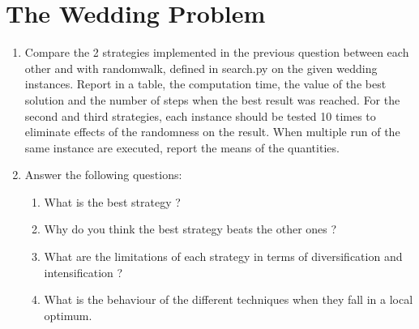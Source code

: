 \section{The Wedding Problem}
\begin{enumerate}
    \item Compare the 2 strategies implemented in the previous question between each other and with randomwalk, defined in search.py on the given wedding instances. Report in a table, the computation time, the value of the best solution and the number of steps when the best result was reached. For the second and third strategies, each instance should be tested 10 times to eliminate effects of the randomness on the result. When multiple run of the same instance are executed, report the means of the quantities.
    \begin{framed}
    \end{framed}

    \item Answer the following questions:
    	\begin{enumerate}
    		\item What is the best strategy ?
    			\begin{framed}
    			\end{framed}
    		\item Why do you think the best strategy beats the other ones ?
    			\begin{framed}
    			\end{framed}
    		\item What are the limitations of each strategy in terms of diversification and intensification ?
    			\begin{framed}
    			\end{framed}
    		\item What is the behaviour of the different techniques when they fall in a local optimum.
    			\begin{framed}
    			\end{framed}
    	\end{enumerate}
\end{enumerate}
